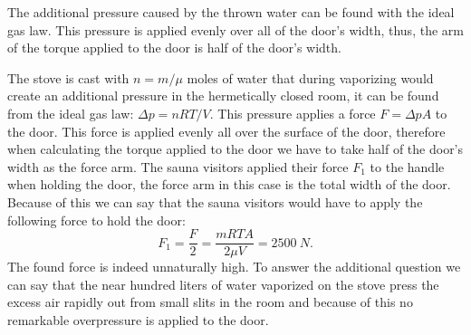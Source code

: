 {\ifEngHint
The additional pressure caused by the thrown water can be found with the ideal gas law. This pressure is applied evenly over all of the door's width, thus, the arm of the torque applied to the door is half of the door's width.
\fi


\ifEngSolution
The stove is cast with $n=m/\mu$ moles of water that during vaporizing would create an additional pressure in the hermetically closed room, it can be found from the ideal gas law: $\Delta p = nRT/V$. This pressure applies a force $F=\Delta p A$ to the door. This force is applied evenly all over the surface of the door, therefore when calculating the torque applied to the door we have to take half of the door’s width as the force arm. The sauna visitors applied their force $F_1$ to the handle when holding the door, the force arm in this case is the total width of the door. Because of this we can say that the sauna visitors would have to apply the following force to hold the door:
\[F_1 = \frac{F}{2} = \frac{mRTA}{2 \mu V} = \SI{2500}{N}.\] 
The found force is indeed unnaturally high. To answer the additional question we can say that the near hundred liters of water vaporized on the stove press the excess air rapidly out from small slits in the room and because of this no remarkable overpressure is applied to the door.
\fi
}